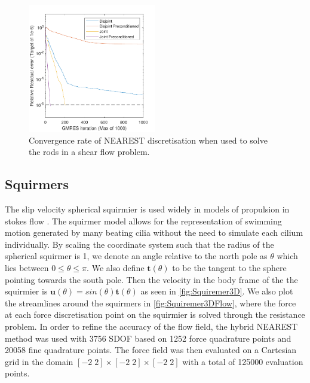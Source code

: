 \begin{figure}
    \centering
    \includegraphics[width=0.5\textwidth]{Images/Rods/NearestPrecon.pdf}
    \caption{Convergence rate of NEAREST discretisation when used to solve the rods in a shear flow problem.}
    \label{fig:NearestConverge}
\end{figure}

\subsection{Squirmers}
The slip velocity spherical squirmier is used widely in models of propulsion in stokes flow \cite{Smith2021TheSelf-Propulsion,Lauga2020TheModel,Pedley2016SquirmersSwimming}. The squirmer model allows for the representation of swimming motion generated by many beating cilia without the need to simulate each cilium individually. By scaling the coordinate system such that the radius of the spherical squirmer is 1, we denote an angle relative to the north pole as $\theta$ which lies between $0\leq\theta\leq\pi$. We also define $\bm{t}(\theta)$ to be the tangent to the sphere pointing towards the south pole. Then the velocity in the body frame of the the squirmier is $\bm{u}(\theta) = sin(\theta)\bm{t}(\theta)$ as seen in \cref{fig:Squiremer3D}. We also plot the streamlines around the squirmers in \cref{fig:Squiremer3DFlow}, where the force at each force discretisation point on the squirmier is solved through the resistance problem. In order to refine the accuracy of the flow field, the hybrid NEAREST method was used with 3756 SDOF based on 1252 force quadrature points and 20058 fine quadrature points. The force field was then evaluated on a Cartesian grid in the domain $[-2\; 2] \times [-2\; 2] \times [-2\; 2]$ with a total of 125000 evaluation points. 

